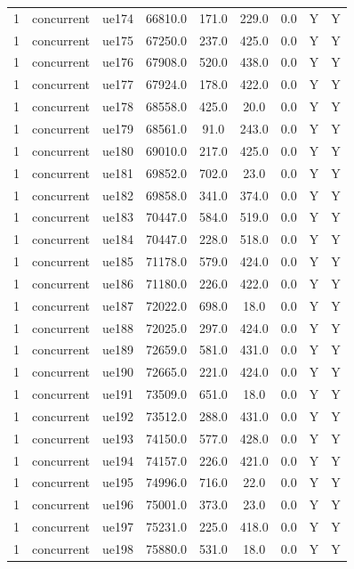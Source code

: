 \begin{table}[ht]
\begin{tabular}{|c|c|c|c|c|c|c|c|c|}
1 & concurrent & ue174 & 66810.0 & 171.0 & 229.0 & 0.0 & Y & Y \\
1 & concurrent & ue175 & 67250.0 & 237.0 & 425.0 & 0.0 & Y & Y \\
1 & concurrent & ue176 & 67908.0 & 520.0 & 438.0 & 0.0 & Y & Y \\
1 & concurrent & ue177 & 67924.0 & 178.0 & 422.0 & 0.0 & Y & Y \\
1 & concurrent & ue178 & 68558.0 & 425.0 & 20.0 & 0.0 & Y & Y \\
1 & concurrent & ue179 & 68561.0 & 91.0 & 243.0 & 0.0 & Y & Y \\
1 & concurrent & ue180 & 69010.0 & 217.0 & 425.0 & 0.0 & Y & Y \\
1 & concurrent & ue181 & 69852.0 & 702.0 & 23.0 & 0.0 & Y & Y \\
1 & concurrent & ue182 & 69858.0 & 341.0 & 374.0 & 0.0 & Y & Y \\
1 & concurrent & ue183 & 70447.0 & 584.0 & 519.0 & 0.0 & Y & Y \\
1 & concurrent & ue184 & 70447.0 & 228.0 & 518.0 & 0.0 & Y & Y \\
1 & concurrent & ue185 & 71178.0 & 579.0 & 424.0 & 0.0 & Y & Y \\
1 & concurrent & ue186 & 71180.0 & 226.0 & 422.0 & 0.0 & Y & Y \\
1 & concurrent & ue187 & 72022.0 & 698.0 & 18.0 & 0.0 & Y & Y \\
1 & concurrent & ue188 & 72025.0 & 297.0 & 424.0 & 0.0 & Y & Y \\
1 & concurrent & ue189 & 72659.0 & 581.0 & 431.0 & 0.0 & Y & Y \\
1 & concurrent & ue190 & 72665.0 & 221.0 & 424.0 & 0.0 & Y & Y \\
1 & concurrent & ue191 & 73509.0 & 651.0 & 18.0 & 0.0 & Y & Y \\
1 & concurrent & ue192 & 73512.0 & 288.0 & 431.0 & 0.0 & Y & Y \\
1 & concurrent & ue193 & 74150.0 & 577.0 & 428.0 & 0.0 & Y & Y \\
1 & concurrent & ue194 & 74157.0 & 226.0 & 421.0 & 0.0 & Y & Y \\
1 & concurrent & ue195 & 74996.0 & 716.0 & 22.0 & 0.0 & Y & Y \\
1 & concurrent & ue196 & 75001.0 & 373.0 & 23.0 & 0.0 & Y & Y \\
1 & concurrent & ue197 & 75231.0 & 225.0 & 418.0 & 0.0 & Y & Y \\
1 & concurrent & ue198 & 75880.0 & 531.0 & 18.0 & 0.0 & Y & Y \\

\end{tabular}
\end{table}
